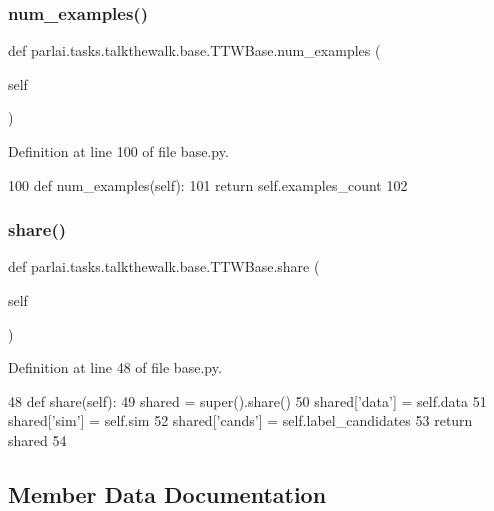 \subsubsection{\texorpdfstring{num\+\_\+examples()}{num\_examples()}}
{\footnotesize\ttfamily def parlai.\+tasks.\+talkthewalk.\+base.\+T\+T\+W\+Base.\+num\+\_\+examples (\begin{DoxyParamCaption}\item[{}]{self }\end{DoxyParamCaption})}



Definition at line 100 of file base.\+py.


\begin{DoxyCode}
100     \textcolor{keyword}{def }num\_examples(self):
101         \textcolor{keywordflow}{return} self.examples\_count
102 \end{DoxyCode}
\mbox{\label{classparlai_1_1tasks_1_1talkthewalk_1_1base_1_1TTWBase_ac8cfd853c90d3dbc0ee6ada6dbc23726}} 
\subsubsection{\texorpdfstring{share()}{share()}}
{\footnotesize\ttfamily def parlai.\+tasks.\+talkthewalk.\+base.\+T\+T\+W\+Base.\+share (\begin{DoxyParamCaption}\item[{}]{self }\end{DoxyParamCaption})}



Definition at line 48 of file base.\+py.


\begin{DoxyCode}
48     \textcolor{keyword}{def }share(self):
49         shared = super().share()
50         shared[\textcolor{stringliteral}{'data'}] = self.data
51         shared[\textcolor{stringliteral}{'sim'}] = self.sim
52         shared[\textcolor{stringliteral}{'cands'}] = self.label\_candidates
53         \textcolor{keywordflow}{return} shared
54 
\end{DoxyCode}


\subsection{Member Data Documentation}
\mbox{\label{classparlai_1_1tasks_1_1talkthewalk_1_1base_1_1TTWBase_a3080a626f294ef819e26aedb322ee99a}} 
